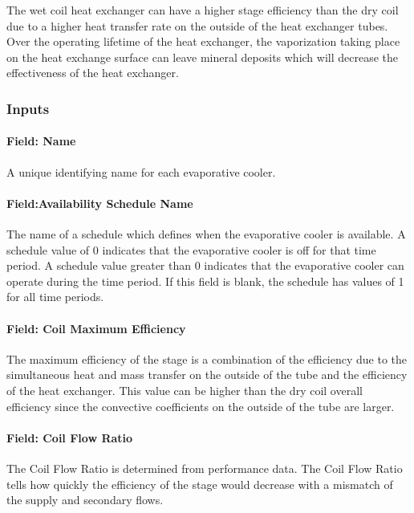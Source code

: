 The wet coil heat exchanger can have a higher stage efficiency than the dry coil due to a higher heat transfer rate on the outside of the heat exchanger tubes. Over the operating lifetime of the heat exchanger, the vaporization taking place on the heat exchange surface can leave mineral deposits which will decrease the effectiveness of the heat exchanger.

\subsubsection{Inputs}\label{inputs-3-012}

\paragraph{Field: Name}\label{field-name-3-011}

A unique identifying name for each evaporative cooler.

\paragraph{Field:Availability Schedule Name}\label{fieldavailability-schedule-name-2}

The name of a schedule which defines when the evaporative cooler is available. A schedule value of 0 indicates that the evaporative cooler is off for that time period. A schedule value greater than 0 indicates that the evaporative cooler can operate during the time period. If this field is blank, the schedule has values of 1 for all time periods.

\paragraph{Field: Coil Maximum Efficiency}\label{field-coil-maximum-efficiency}

The maximum efficiency of the stage is a combination of the efficiency due to the simultaneous heat and mass transfer on the outside of the tube and the efficiency of the heat exchanger. This value can be higher than the dry coil overall efficiency since the convective coefficients on the outside of the tube are larger.

\paragraph{Field: Coil Flow Ratio}\label{field-coil-flow-ratio}

The Coil Flow Ratio is determined from performance data. The Coil Flow Ratio tells how quickly the efficiency of the stage would decrease with a mismatch of the supply and secondary flows.

